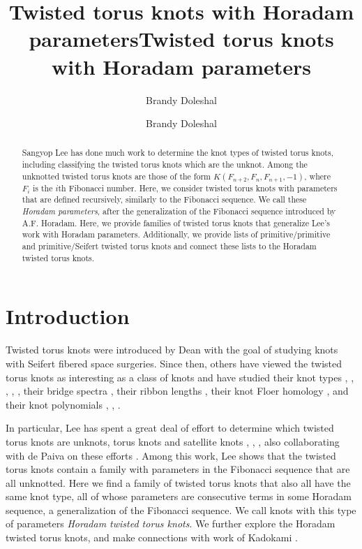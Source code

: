 \documentclass{amsart}
\title{Twisted torus knots with Horadam parameters}
\author{Brandy Doleshal}
\begin{document}
\title{Twisted torus knots with Horadam parameters}

\author{Brandy Doleshal}
\address{Sam Houston State University \\
Box 2206 \\
Huntsville, TX, 77341}


\maketitle

\begin{abstract}
Sangyop Lee has done much work to determine the knot types of twisted torus knots, including classifying the twisted torus knots which are the unknot. Among the unknotted twisted torus knots are those of the form $K(F_{n+2}, F_n, F_{n+1}, -1)$, where $F_i$ is the $i$th Fibonacci number. Here, we consider twisted torus knots with parameters that are defined recursively, similarly to the Fibonacci sequence. We call these \textit{Horadam parameters}, after the generalization of the Fibonacci sequence introduced by A.F. Horadam. Here, we provide families of twisted torus knots that generalize Lee's work with Horadam parameters. Additionally, we provide lists of primitive/primitive and primitive/Seifert twisted torus knots and connect these lists to the Horadam twisted torus knots.
\end{abstract}


\section{Introduction}

Twisted torus knots were introduced by Dean \cite{DeanSFSSurgeries} with the goal of studying knots with Seifert fibered space surgeries. Since then, others have viewed the twisted torus knots as interesting as a class of knots and have studied their knot types \cite{krishnamorton}, \cite{LeeTTKUnknots}, \cite{LeeTTKTypes}, \cite{LeeTTKTorus}, \cite{LeedePaiva}, their bridge spectra \cite{BowmanBridgeSpectra}, their ribbon lengths \cite{KimRibbonLength}, their knot Floer homology \cite{VafaeeKnotFloer}, and their knot polynomials \cite{adnanpark}, \cite{BavierDoleshal}, \cite{MortonAlexPoly}.

In particular, Lee has spent a great deal of effort to determine which twisted torus knots are unknots, torus knots and satellite knots \cite{LeeTTKUnknots}, \cite{LeeTTKTypes}, \cite{LeeTTKTorus}, also collaborating with de Paiva on these efforts \cite{LeedePaiva}. Among this work, Lee \cite{LeeTTKUnknots} shows that the twisted torus knots contain a family with parameters in the Fibonacci sequence that are all unknotted. Here we find a family of twisted torus knots that also all have the same knot type, all of whose parameters are consecutive terms in some Horadam sequence, a generalization of the Fibonacci sequence. We call knots with this type of parameters \textit{Horadam twisted torus knots}. We further explore the Horadam twisted torus knots, and make connections with work of Kadokami \cite{Kadokami}.
\end{document}
